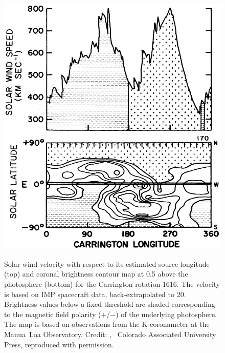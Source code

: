 \begin{figure}[t]
\begin{floatrow}
{			\includegraphics[width=0.85\Xhsize]{figures_of_others/images/Hundhausen1977_fig10_cut.png}
		}{
			\caption[Credit: {\citet[Fig.~10]{Hundhausen1977}}, \textcopyright~Colorado Associated University Press, reproduced with permission.]
			{Solar wind velocity with respect to its estimated source longitude (top) and coronal brightness contour map at \SI{0.5}{\Rs} above the photosphere (bottom) for the Carrington rotation 1616. The velocity is based on IMP spacecraft data, back-extrapolated to \SI{20}{\Rs}. Brightness values below a fixed threshold are shaded corresponding to the magnetic field polarity ($+$/$-$) of the underlying photosphere. The map is based on observations from the K-coronameter at the Manua~Loa Observatory. Credit: {\citet[Fig.~10]{Hundhausen1977}}, \textcopyright~Colorado Associated University Press, reproduced with permission.}
			\label{fig:Hundhausen1977_fig10_cut}
		}
	\end{floatrow}
\end{figure}
